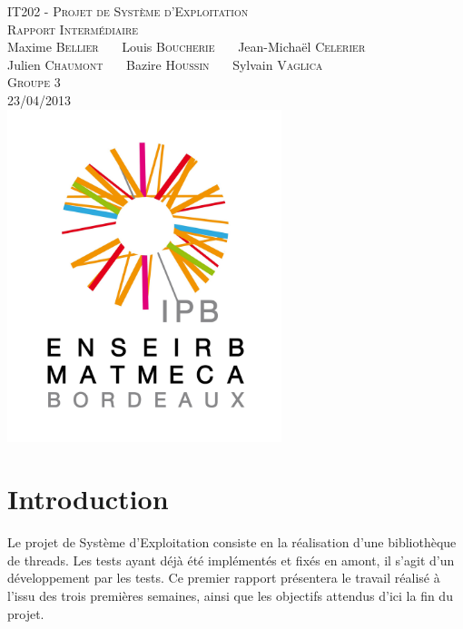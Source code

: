 \documentclass[a4paper,11pt]{article}
\begin{document}
\begin{titlepage}
  \begin{center}

    \textsc{\LARGE IT202 - Projet de Système d'Exploitation}\\[2cm]
    \textsc{\large Rapport Intermédiaire}\\[3cm]
    Maxime \textsc{Bellier} \ \ \ Louis \textsc{Boucherie} \ \ \ Jean-Michaël \textsc{Celerier}\\
    Julien \textsc{Chaumont} \ \ \ Bazire \textsc{Houssin} \ \ \ Sylvain \textsc{Vaglica}\\[1cm]
    \textsc{Groupe 3}\\[1.5cm]
    \textsc{\large 23/04/2013 }\\[1.5cm]
    \includegraphics[width=8cm]{logo.png}

  \end{center}
  \vspace{3cm}

\end{titlepage}

\clearpage


\section*{Introduction}

Le projet de Système d'Exploitation consiste en la réalisation d'une bibliothèque de threads. Les tests ayant déjà été implémentés et fixés en amont, il s'agit d'un développement par les tests. Ce premier rapport présentera le travail réalisé à l'issu des trois premières semaines, ainsi que les objectifs attendus d'ici la fin du projet.
\end{document}
